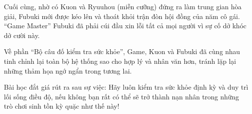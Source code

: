 \documentclass[../main.tex]{subfiles}
\begin{document}
Cuối cùng, nhờ có Kuon và Ryuuhou (miễn cưỡng) đứng ra làm trung gian hòa giải, Fubuki mới được kéo lên và thoát khỏi trận đòn hội đồng của năm cô gái. ``Game Master'' Fubuki đã phải cúi đầu xin lỗi tất cả mọi người vì sự cố dở khóc dở cười này.

Về phần ``Bộ câu đố kiểm tra sức khỏe'', Game, Kuon và Fubuki đã cùng nhau tinh chỉnh lại toàn bộ hệ thống sao cho hợp lý và nhân văn hơn, tránh lặp lại những thảm họa ngớ ngẩn trong tương lai.

Bài học đắt giá rút ra sau sự việc: Hãy luôn kiểm tra sức khỏe định kỳ và duy trì lối sống điều độ, nếu không bạn rất có thể sẽ trở thành nạn nhân trong những trò chơi sinh tồn kỳ quặc như thế này!
\end{document}
